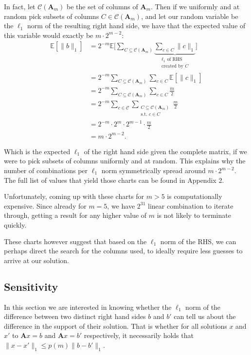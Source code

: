 \documentclass{article}
\newcommand\norm[1]{\lVert#1\rVert}
\begin{document}
In fact, let $ \mathcal{C}(\mathbf{A}_m) $ be the set of columns of $ \mathbf{A}_m $. Then if we uniformly and at random pick subsets of columns $C \in \mathcal{C}(\mathbf{A}_m) $, and let our random variable be the $ \ell_1 $ norm of the resulting right hand side, we have that the expected value of this variable would exactly be $m\cdot2^{m-2}$:
\begin{align*}
\mathbb{E}\left[\norm{b}_1\right] &= 2^{-m}\mathbb{E}\Bigg[\sum_{C \subseteq \mathcal{C}(\mathbf{A}_m)} \underbrace{\sum_{c \in C} \norm{c}_1}_{\substack{\ell_1 \text{ of RHS} \\ \text{created by } C}}\Bigg]  \\
&= 2^{-m}\sum_{C \subseteq \mathcal{C}(\mathbf{A}_m)}\sum_{c \in C} \mathbb{E}\left[\norm{c}_1\right]\\
&= 2^{-m}\sum_{C \subseteq \mathcal{C}(\mathbf{A}_m)}\sum_{c \in C}
\frac{m}{2}\\
&= 2^{-m}\sum_{c \in \mathcal{C}}\sum_{\substack{C \subseteq \mathcal{C}(\mathbf{A}_m) \\ \text{s.t. } c \in C}}  \frac{m}{2}\\
&= 2^{-m}\cdot 2^m \cdot 2^{m-1} \cdot \frac{m}{2}\\
&= m \cdot 2^{m-2}.
\end{align*}

Which is the expected $ \ell_1 $ of the right hand side given the complete matrix, if we were to pick subsets of columns uniformly and at random. This explains why the number of combinations per $ \ell_1 $ norm symmetrically spread around $ m  \cdot 2^{m-2}$. The full list of values that yield those charts can be found in Appendix 2.

Unfortunately, coming up with these charts for $ m>5 $ is computationally expensive. Since already for $ m=5 $, we have $ 2^{31} $ linear combination to iterate through, getting a result for any higher value of $ m $ is not likely to terminate quickly. 

These charts however suggest that based on the $ \ell_1 $ norm of the RHS, we can perhaps direct the search for the columns used, to ideally require less guesses to arrive at our solution. 


\subsection{Sensitivity}
In this section we are interested in knowing whether the $\ell_1$ norm of the difference between two distinct right hand sides $b$ and $b'$ can tell us about the difference in the support of their solution. That is whether for all solutions $x$ and $x'$ to $\mathbf{A}x = b$ and $\mathbf{A}x = b'$ respectively, it necessarily holds that $\norm{x-x'}_1 \leq p(m)\norm{b-b'}_1$.
\end{document}
